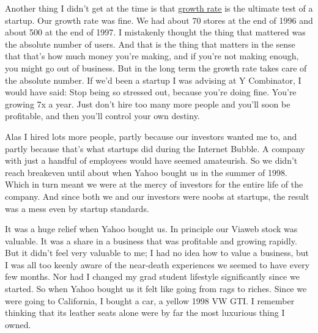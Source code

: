 Another thing I didn't get at the time is
                  that \href{http://www.paulgraham.com/growth.html}{\underline{growth rate}} is the
                  ultimate test of a startup. Our growth rate was fine. We had
                  about 70 stores at the end of 1996 and about 500 at the end of
                  1997. I mistakenly thought the thing that mattered was the
                  absolute number of users. And that is the thing that matters
                  in the sense that that's how much money you're making, and if
                  you're not making enough, you might go out of business. But in
                  the long term the growth rate takes care of the absolute
                  number. If we'd been a startup I was advising at Y Combinator,
                  I would have said: Stop being so stressed out, because you're
                  doing fine. You're growing 7x a year. Just don't hire too many
                  more people and you'll soon be profitable, and then you'll
                  control your own destiny.

Alas I hired lots more
                  people, partly because our investors wanted me to, and partly
                  because that's what startups did during the Internet Bubble. A
                  company with just a handful of employees would have seemed
                  amateurish. So we didn't reach breakeven until about when
                  Yahoo bought us in the summer of 1998. Which in turn meant we
                  were at the mercy of investors for the entire life of the
                  company. And since both we and our investors were noobs at
                  startups, the result was a mess even by startup standards.

It
                  was a huge relief when Yahoo bought us. In principle our
                  Viaweb stock was valuable. It was a share in a business that
                  was profitable and growing rapidly. But it didn't feel very
                  valuable to me; I had no idea how to value a business, but I
                  was all too keenly aware of the near-death experiences we
                  seemed to have every few months. Nor had I changed my grad
                  student lifestyle significantly since we started. So when
                  Yahoo bought us it felt like going from rags to riches. Since
                  we were going to California, I bought a car, a yellow 1998 VW
                  GTI. I remember thinking that its leather seats alone were by
                  far the most luxurious thing I owned.

